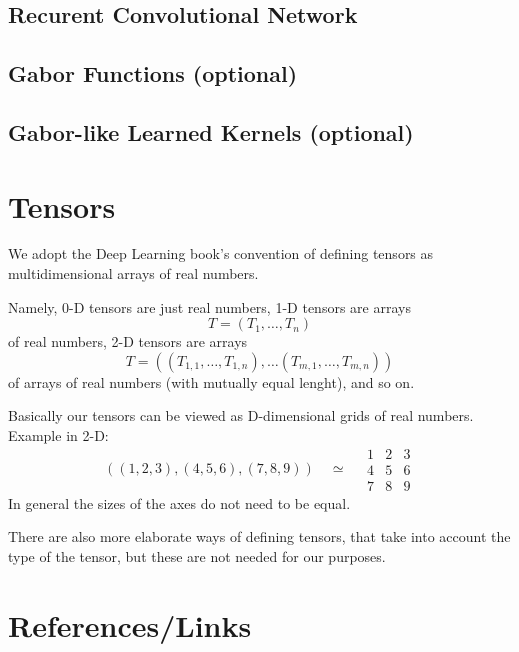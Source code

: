 \documentclass[]{article}
\begin{document}
\subsection{Recurent Convolutional Network}

\subsection{Gabor Functions (optional)}

\subsection{Gabor-like Learned Kernels (optional)}

\section{Tensors}

We adopt the Deep Learning book's convention of defining tensors as
multidimensional arrays of real numbers.

Namely, 0-D tensors are just real numbers, 1-D tensors are arrays
\[
T = (T_1, \ldots, T_n)
\]
of real numbers, 2-D tensors are arrays
\[
T = ((T_{1,1}, \ldots, T_{1,n}), \ldots (T_{m,1}, \ldots, T_{m,n}))
\]
of arrays of real numbers (with mutually equal lenght), and so on.

Basically our tensors can be viewed as D-dimensional grids of real numbers.
Example in 2-D:
\[
((1, 2, 3), (4, 5, 6), (7, 8, 9)) \quad \simeq \quad
\begin{array}{c|c|c}
  1 & 2 & 3 \\
  \hline
  4 & 5 & 6 \\
  \hline
  7 & 8 & 9
 \end{array}
\]
In general the sizes of the axes do not need to be equal.

There are also more elaborate ways of defining tensors, that take into account
the type of the tensor, but these are not needed for our purposes.

\section{References/Links}
\end{document}
